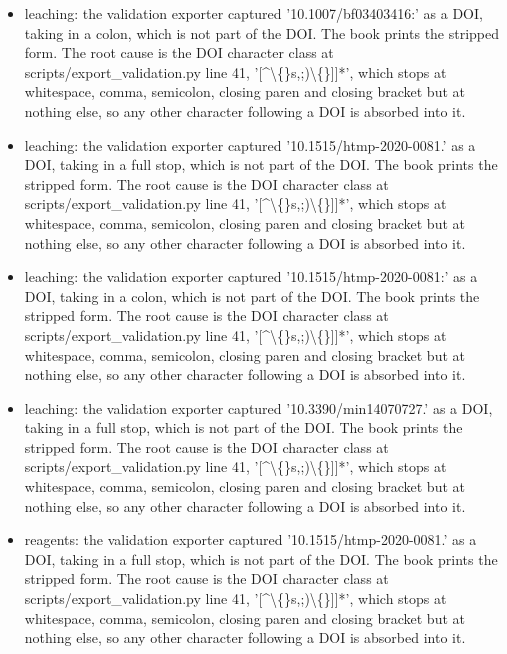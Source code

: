 \documentclass[10pt,a4paper,twoside]{report}
\begin{document}
\begin{itemize}
\item leaching: the validation exporter captured '10.1007/bf03403416:' as a DOI, taking in a colon, which is not part of the DOI. The book prints the stripped form. The root cause is the DOI character class at scripts/export\_validation.py line 41, '[\textasciicircum{}\textbackslash\{\}s,;)\textbackslash\{\}]]*', which stops at whitespace, comma, semicolon, closing paren and closing bracket but at nothing else, so any other character following a DOI is absorbed into it.

\item leaching: the validation exporter captured '10.1515/htmp-2020-0081.' as a DOI, taking in a full stop, which is not part of the DOI. The book prints the stripped form. The root cause is the DOI character class at scripts/export\_validation.py line 41, '[\textasciicircum{}\textbackslash\{\}s,;)\textbackslash\{\}]]*', which stops at whitespace, comma, semicolon, closing paren and closing bracket but at nothing else, so any other character following a DOI is absorbed into it.

\item leaching: the validation exporter captured '10.1515/htmp-2020-0081:' as a DOI, taking in a colon, which is not part of the DOI. The book prints the stripped form. The root cause is the DOI character class at scripts/export\_validation.py line 41, '[\textasciicircum{}\textbackslash\{\}s,;)\textbackslash\{\}]]*', which stops at whitespace, comma, semicolon, closing paren and closing bracket but at nothing else, so any other character following a DOI is absorbed into it.

\item leaching: the validation exporter captured '10.3390/min14070727.' as a DOI, taking in a full stop, which is not part of the DOI. The book prints the stripped form. The root cause is the DOI character class at scripts/export\_validation.py line 41, '[\textasciicircum{}\textbackslash\{\}s,;)\textbackslash\{\}]]*', which stops at whitespace, comma, semicolon, closing paren and closing bracket but at nothing else, so any other character following a DOI is absorbed into it.

\item reagents: the validation exporter captured '10.1515/htmp-2020-0081.' as a DOI, taking in a full stop, which is not part of the DOI. The book prints the stripped form. The root cause is the DOI character class at scripts/export\_validation.py line 41, '[\textasciicircum{}\textbackslash\{\}s,;)\textbackslash\{\}]]*', which stops at whitespace, comma, semicolon, closing paren and closing bracket but at nothing else, so any other character following a DOI is absorbed into it.


\end{itemize}
\end{document}
